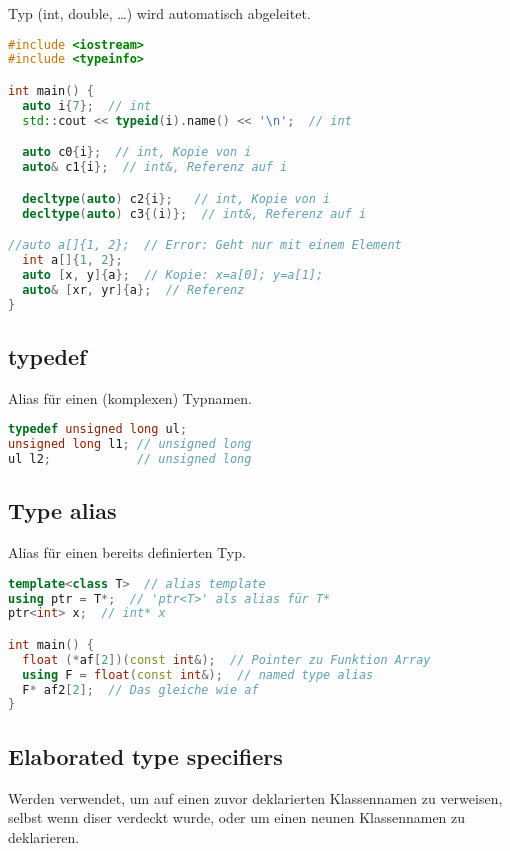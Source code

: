 Typ (int, double, \dots) wird automatisch abgeleitet.

\begin{lstlisting}[language=C++]
#include <iostream>
#include <typeinfo>

int main() {
  auto i{7};  // int
  std::cout << typeid(i).name() << '\n';  // int

  auto c0{i};  // int, Kopie von i
  auto& c1{i};  // int&, Referenz auf i

  decltype(auto) c2{i};   // int, Kopie von i
  decltype(auto) c3{(i)};  // int&, Referenz auf i

//auto a[]{1, 2};  // Error: Geht nur mit einem Element
  int a[]{1, 2};
  auto [x, y]{a};  // Kopie: x=a[0]; y=a[1];
  auto& [xr, yr]{a};  // Referenz
}
\end{lstlisting}

\subsection{typedef}

Alias für einen (komplexen) Typnamen.

\begin{lstlisting}[language=C++]
typedef unsigned long ul;
unsigned long l1; // unsigned long
ul l2;            // unsigned long
\end{lstlisting}

\subsection{Type alias}

Alias für einen bereits definierten Typ.

\begin{lstlisting}[language=C++]
template<class T>  // alias template
using ptr = T*;  // 'ptr<T>' als alias für T*
ptr<int> x;  // int* x

int main() {
  float (*af[2])(const int&);  // Pointer zu Funktion Array
  using F = float(const int&);  // named type alias
  F* af2[2];  // Das gleiche wie af
}
\end{lstlisting}

\subsection{Elaborated type specifiers}

Werden verwendet, um auf einen zuvor deklarierten Klassennamen zu verweisen,
selbst wenn diser verdeckt wurde, oder um einen neunen Klassennamen zu
deklarieren.


